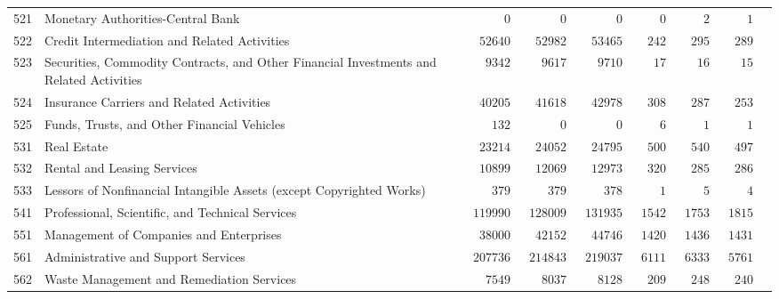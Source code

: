 \documentclass[9pt, oneside]{article}   	%
\begin{document}
\begin{longtable}{lp{3 in}ccccccc}
521  & Monetary Authorities-Central Bank & $\phantom{000000}0$ & $\phantom{000000}0$ & $\phantom{000000}0$ & $\phantom{0000}0$ & $\phantom{0000}2$ & $\phantom{0000}1$ \\
522  & Credit Intermediation and Related Activities & $\phantom{00}52640$ & $\phantom{00}52982$ & $\phantom{00}53465$ & $\phantom{00}242$ & $\phantom{00}295$ & $\phantom{00}289$ \\
523  & Securities, Commodity Contracts, and Other Financial Investments and Related Activities & $\phantom{000}9342$ & $\phantom{000}9617$ & $\phantom{000}9710$ & $\phantom{000}17$ & $\phantom{000}16$ & $\phantom{000}15$ \\
524  & Insurance Carriers and Related Activities & $\phantom{00}40205$ & $\phantom{00}41618$ & $\phantom{00}42978$ & $\phantom{00}308$ & $\phantom{00}287$ & $\phantom{00}253$ \\
525  & Funds, Trusts, and Other Financial Vehicles & $\phantom{0000}132$ & $\phantom{000000}0$ & $\phantom{000000}0$ & $\phantom{0000}6$ & $\phantom{0000}1$ & $\phantom{0000}1$ \\
531  & Real Estate & $\phantom{00}23214$ & $\phantom{00}24052$ & $\phantom{00}24795$ & $\phantom{00}500$ & $\phantom{00}540$ & $\phantom{00}497$ \\
532  & Rental and Leasing Services & $\phantom{00}10899$ & $\phantom{00}12069$ & $\phantom{00}12973$ & $\phantom{00}320$ & $\phantom{00}285$ & $\phantom{00}286$ \\
533  & Lessors of Nonfinancial Intangible Assets (except Copyrighted Works) & $\phantom{0000}379$ & $\phantom{0000}379$ & $\phantom{0000}378$ & $\phantom{0000}1$ & $\phantom{0000}5$ & $\phantom{0000}4$ \\
541  & Professional, Scientific, and Technical Services & $\phantom{0}119990$ & $\phantom{0}128009$ & $\phantom{0}131935$ & $\phantom{0}1542$ & $\phantom{0}1753$ & $\phantom{0}1815$ \\
551  & Management of Companies and Enterprises & $\phantom{00}38000$ & $\phantom{00}42152$ & $\phantom{00}44746$ & $\phantom{0}1420$ & $\phantom{0}1436$ & $\phantom{0}1431$ \\
561  & Administrative and Support Services & $\phantom{0}207736$ & $\phantom{0}214843$ & $\phantom{0}219037$ & $\phantom{0}6111$ & $\phantom{0}6333$ & $\phantom{0}5761$ \\
562  & Waste Management and Remediation Services & $\phantom{000}7549$ & $\phantom{000}8037$ & $\phantom{000}8128$ & $\phantom{00}209$ & $\phantom{00}248$ & $\phantom{00}240$ \\

\end{longtable}
\end{document}
